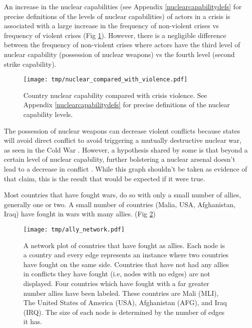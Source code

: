 \documentclass[12pt,parskip=half-]{scrartcl}
\begin{document}
\begin{minipage}{\textwidth}
    An increase in the nuclear capabilities (see Appendix
    \ref{nuclearcapabilitydefs} for precise definitions of the levels of
    nuclear capabilities) of actors in a crisis is associated with a large
    increase in the frequency of non-violent crises vs frequency of violent
    crises (Fig \ref{nuclear_compared_with_violence.pdf}). However, there is a
    negligible difference between the frequency of non-violent crises where
    actors have the third level of nuclear capability (possession of nuclear
    weapons) vs the fourth level (second strike capability).

    \begin{figure}
        \centering
        \texttt{[image: tmp/nuclear\_compared\_with\_violence.pdf]}
        \caption{Country nuclear capability compared with crisis violence. See
            Appendix \ref{nuclearcapabilitydefs} for precise definitions of the nuclear
            capability levels.}
        \label{nuclear_compared_with_violence.pdf}
    \end{figure}

    The possession of nuclear weapons can decrease violent conflicts because
    states will avoid direct conflict to avoid triggering a mutually
    destructive nuclear war, as seen in the Cold War \cite{mad}. However, a
    hypothesis shared by some is that beyond a certain level of nuclear
    capability, further bolstering a nuclear arsenal doesn't lead to a decrease
    in conflict \cite{nukesvideo}. While this graph shouldn't be taken as
    evidence of that claim, this is the result that would be expected if it
    were true.
\end{minipage}

\begin{minipage}{\textwidth}
    Most countries that have fought wars, do so with only a small number of
    allies, generally one or two. A small number
    of countries (Malia, USA, Afghanistan, Iraq) have fought in wars with many
    allies. (Fig \ref{ally_network.pdf})

    \begin{figure}
        \centering
        \texttt{[image: tmp/ally\_network.pdf]}
        \caption{A network plot of countries that have fought as allies. Each
            node is a country and every edge represents an instance where two
            countries have fought on the same side. Countries that have not had
            any allies in conflicts they have fought (i.e, nodes with no edges)
            are not displayed. Four countries which have fought with a far
            greater number allies have been labeled. These countries are Mali
            (MLI), The United States of America (USA), Afghanistan (AFG), and
            Iraq (IRQ). The size of each node is determined by the number of
            edges it has.}
        \label{ally_network.pdf}
    \end{figure}
\end{minipage}
\end{document}
